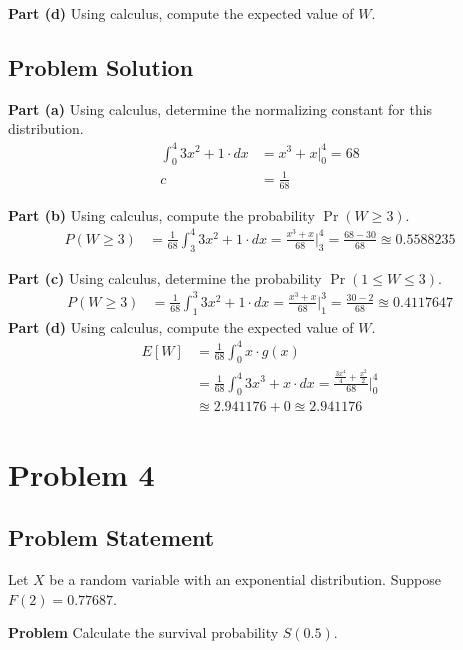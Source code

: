 \documentclass[12pt]{article}
\theoremstyle{definition}
\begin{document}
\bigskip
\noindent
{\bf Part (d)} Using calculus, compute the expected value of $W$.




\subsection*{Problem Solution}
\bigskip
\noindent
{\bf Part (a)} Using calculus, determine the normalizing constant for this distribution.
\begin{align*}
\int_0^4 3x^2 + 1 \cdot dx &= x^3 + x \biggr\rvert_0^{4} = 68\\
c &= \frac{1}{68}
\end{align*}

\bigskip
\noindent
{\bf Part (b)} Using calculus, compute the probability $\Pr(W \geq 3)$.
\begin{align*}
P(W \geq 3) &= \frac{1}{68} \int_3^4 3x^2 + 1 \cdot dx = \frac{x^3 + x}{68} \biggr\rvert_3^4 = \frac{68 - 30}{68} \approxeq 0.5588235
\end{align*}

\bigskip
\noindent
{\bf Part (c)} Using calculus, determine the probability $\Pr(1 \leq W \leq 3)$.
\begin{align*}
P(W \geq 3) &= \frac{1}{68} \int_1^3 3x^2 + 1 \cdot dx = \frac{x^3 + x}{68} \biggr\rvert_1^3 = \frac{30 - 2}{68} \approxeq 0.4117647
\end{align*}
\bigskip
\noindent
{\bf Part (d)} Using calculus, compute the expected value of $W$.
\begin{align*}
E[W] &= \frac{1}{68} \int_0^4 x \cdot g(x)\\
&= \frac{1}{68} \int_0^4 3x^3 + x \cdot dx = \frac{\frac{3x^4}{4} + \frac{x^2}{2}}{68} \biggr\rvert_0^4\\
&\approxeq 2.941176 + 0 \approxeq 2.941176
\end{align*}


\newpage
\section*{Problem 4}

\subsection*{Problem Statement}

Let $X$ be a random variable with an exponential distribution. Suppose $F(2) = 0.77687$.

\bigskip
\noindent
{\bf Problem} Calculate the survival probability $S(0.5)$.
\end{document}
